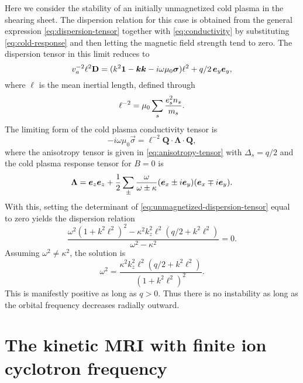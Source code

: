 \documentclass[aps,pre,notitlepage,amsmath,amssymb,amsfonts,nobibnotes,nofootinbib,superscriptaddress]{revtex4-1}
\begin{document}
Here we consider the stability of an initially unmagnetized cold plasma in the
shearing sheet. The dispersion relation for this case is obtained from the
general expression \cref{eq:dispersion-tensor} together with
\cref{eq:conductivity} by substituting \cref{eq:cold-response} and then
letting the magnetic field strength tend to zero. The dispersion tensor in
this limit reduces to
\begin{equation}
  \label{eq:unmagnetized-dispersion-tensor}
  \va^{-2}\ell^2\mathbf{D} =
  (k^2\mathbf{1} - \vec{k}\vec{k} - i\omega\mu_0\vec{\sigma})\ell^2
  + q/2\,\ey\ey,
\end{equation}
where $\ell$ is the mean inertial length, defined through
\begin{equation}
  \ell^{-2} = \mu_0\sum_s\frac{e_s^2n_s}{m_s}.
\end{equation}
The limiting form of the cold plasma conductivity tensor is
\begin{equation}
  \label{eq:zero-mag-conductivity}
  -i\omega\mu_0\vec{\sigma} =
  \ell^{-2}\mathbf{Q}\cdot\mathbf{\Lambda}\cdot\mathbf{Q},
\end{equation}
where the anisotropy tensor is given in \cref{eq:anisotropy-tensor} with
$\Delta_s=q/2$ and the cold plasma response tensor for $B=0$ is
\begin{equation}
  \label{eq:zero-mag-response}
  \mathbf{\Lambda} = \ez\ez
  + \frac{1}{2}\sum_{\pm}\frac{\omega}{\omega\pm\kappa}
  (\ex\pm i\ey)(\ex\mp i\ey).
\end{equation}
With this, setting the determinant of \cref{eq:unmagnetized-dispersion-tensor}
equal to zero yields the dispersion relation
\begin{equation}
  \frac{\omega^2{(1 + k^2\ell^2)}^2 - \kappa^2 k_z^2\ell^2(q/2 + k^2\ell^2)}
  {\omega^2 - \kappa^2} = 0.
\end{equation}
Assuming $\omega^2\ne\kappa^2$, the solution is
\begin{equation}
  \omega^2 =
  \frac{\kappa^2k_z^2\ell^2(q/2 + k^2\ell^2)}{{(1 + k^2\ell^2)}^2}.
\end{equation}
This is manifestly positive as long as $q>0$. Thus there is no instability as
long as the orbital frequency decreases radially outward.

\section{The kinetic MRI with finite ion cyclotron frequency}
\label{sec:MRI-finite-cyc}
\end{document}
